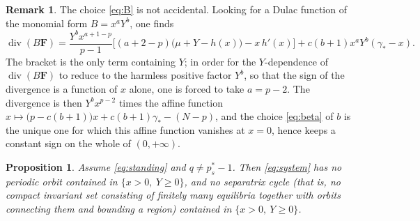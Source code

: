\documentclass[11pt,reqno]{amsart}
\numberwithin{equation}{section}
\theoremstyle{plain}
\newtheorem{proposition}[theorem]{Proposition}
\theoremstyle{definition}
\newtheorem{remark}[theorem]{Remark}
\newcommand{\gs}{\gamma_{*}}
\DeclareMathOperator{\dv}{div}
\begin{document}
\begin{remark}
The choice \eqref{eq:B} is not accidental. Looking for a Dulac function of the
monomial form $B=x^{a}Y^{b}$, one finds
\[
\dv(B\mathbf F)=\frac{Y^{b}x^{a+1-p}}{p-1}
\Big[(a+2-p)\big(\mu+Y-h(x)\big)-x\,h'(x)\Big]
+c(b+1)x^{a}Y^{b}(\gs-x).
\]
The bracket is the only term containing $Y$; in order for the $Y$-dependence of
$\dv(B\mathbf F)$ to reduce to the harmless positive factor $Y^{b}$, so that
the sign of the divergence is a function of $x$ alone, one is forced to take
$a=p-2$. The divergence is then $Y^{b}x^{p-2}$ times the affine function
$x\mapsto\big(p-c(b+1)\big)x+c(b+1)\gs-(N-p)$, and the choice \eqref{eq:beta} of
$b$ is the unique one for which this affine function vanishes at $x=0$, hence
keeps a constant sign on the whole of $(0,+\infty)$.
\end{remark}

\begin{proposition}\label{prop:nocycle}
Assume \eqref{eq:standing} and $q\ne p^{*}_{s}-1$. Then \eqref{eq:system} has
no periodic orbit
contained in $\{x>0,\ Y\ge0\}$, and no separatrix cycle (that is, no compact
invariant set consisting of finitely many equilibria together with orbits
connecting them and bounding a region) contained in $\{x>0,\ Y\ge0\}$.
\end{proposition}
\end{document}
